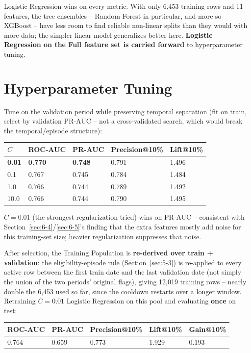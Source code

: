 Logistic Regression wins on every metric. With only 6,453 training rows and 11 features, the tree ensembles -- Random Forest in particular, and more so XGBoost -- have less room to find reliable non-linear splits than they would with more data; the simpler linear model generalizes better here. \textbf{Logistic Regression on the Full feature set is carried forward} to hyperparameter tuning.

\section{Hyperparameter Tuning}
\label{sec:6-7}

Tune on the validation period while preserving temporal separation (fit on train, select by validation PR-AUC -- not a cross-validated search, which would break the temporal/episode structure):

\begin{center}
\begin{tabular}{@{}p{1.8cm}p{1.8cm}p{1.8cm}p{2.4cm}p{1.8cm}@{}}
    \toprule
    $C$ & ROC-AUC & PR-AUC & Precision@10\% & Lift@10\% \\
    \midrule
    \textbf{0.01} & \textbf{0.770} & \textbf{0.748} & 0.791 & 1.496 \\
    0.1 & 0.767 & 0.745 & 0.784 & 1.484 \\
    1.0 & 0.766 & 0.744 & 0.789 & 1.492 \\
    10.0 & 0.766 & 0.744 & 0.790 & 1.495 \\
    \bottomrule
\end{tabular}
\end{center}

$C = 0.01$ (the strongest regularization tried) wins on PR-AUC -- consistent with Section~\ref{sec:6-4}/\ref{sec:6-5}'s finding that the extra features mostly add noise for this training-set size; heavier regularization suppresses that noise.

After selection, the Training Population is \textbf{re-derived over train + validation}: the eligibility-episode rule (Section~\ref{sec:5-3}) is re-applied to every active row between the first train date and the last validation date (not simply the union of the two periods' original flags), giving 12,019 training rows -- nearly double the 6,453 used so far, since the cooldown restarts over a longer window. Retraining $C=0.01$ Logistic Regression on this pool and evaluating \textbf{once} on test:

\begin{center}
\begin{tabular}{@{}p{1.8cm}p{1.8cm}p{2.4cm}p{1.8cm}p{1.8cm}@{}}
    \toprule
    ROC-AUC & PR-AUC & Precision@10\% & Lift@10\% & Gain@10\% \\
    \midrule
    0.764 & 0.659 & 0.773 & 1.929 & 0.193 \\
    \bottomrule
\end{tabular}
\end{center}

